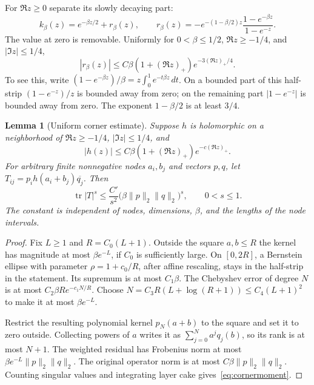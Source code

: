 \documentclass[11pt]{article}
\newtheorem{lemma}[theorem]{Lemma}
\numberwithin{equation}{section}
\newcommand{\tr}{\operatorname{tr}}
\begin{document}
For $\Re z\ge0$ separate its slowly decaying part:
\begin{equation}\label{eq:remainder}
 k_\beta(z)=e^{-\beta z/2}+r_\beta(z),\qquad
 r_\beta(z)=-e^{-(1-\beta/2)z}
                      \frac{1-e^{-\beta z}}{1-e^{-z}}.
\end{equation}
The value at zero is removable. Uniformly for $0<\beta\le1/2$,
$\Re z\ge-1/4$, and $|\Im z|\le1/4$,
\begin{equation}\label{eq:rbound}
 |r_\beta(z)|\le C\beta(1+(\Re z)_+)e^{-3(\Re z)_+/4}.
\end{equation}
To see this, write
$(1-e^{-\beta z})/\beta=z\int_0^1e^{-t\beta z}\,dt$.
On a bounded part of this half-strip $(1-e^{-z})/z$ is bounded away
from zero; on the remaining part $|1-e^{-z}|$ is bounded away from
zero. The exponent $1-\beta/2$ is at least $3/4$.

\begin{lemma}[Uniform corner estimate]\label{lem:corner}
Suppose $h$ is holomorphic on a neighborhood of
$\Re z\ge-1/4$, $|\Im z|\le1/4$, and
\[
 |h(z)|\le C\beta(1+(\Re z)_+)e^{-c(\Re z)_+}.
\]
For arbitrary finite nonnegative nodes $a_i,b_j$ and vectors $p,q$,
let $T_{ij}=p_i h(a_i+b_j)\overline{q_j}$. Then
\begin{equation}\label{eq:cornermoment}
 \tr|T|^s\le\frac{C'}{s^2}
                 \big(\beta\|p\|_2\|q\|_2\big)^s,\qquad0<s\le1.
\end{equation}
The constant is independent of nodes, dimensions, $\beta$, and
the lengths of the node intervals.
\end{lemma}
\begin{proof}
Fix $L\ge1$ and $R=C_0(L+1)$. Outside the square $a,b\le R$ the
kernel has magnitude at most $\beta e^{-L}$, if $C_0$ is sufficiently
large. On $[0,2R]$, a Bernstein ellipse with parameter
$\rho=1+c_0/R$, after affine rescaling, stays in the half-strip in
the statement. Its supremum is at most $C_1\beta$.
The Chebyshev error of degree $N$ is at most
$C_2\beta R e^{-c_1N/R}$. Choose
$N=C_3R(L+\log(R+1))\le C_4(L+1)^2$ to make it at most
$\beta e^{-L}$.

Restrict the resulting polynomial kernel $p_N(a+b)$ to the square
and set it to zero outside. Collecting powers of $a$ writes it as
$\sum_{j=0}^N a^j q_j(b)$, so its rank is at most $N+1$.
The weighted residual has Frobenius norm at most
$\beta e^{-L}\|p\|_2\|q\|_2$. The original operator norm is at most
$C\beta\|p\|_2\|q\|_2$. Counting singular values and integrating
layer cake gives~\eqref{eq:cornermoment}.
\end{proof}
\end{document}
